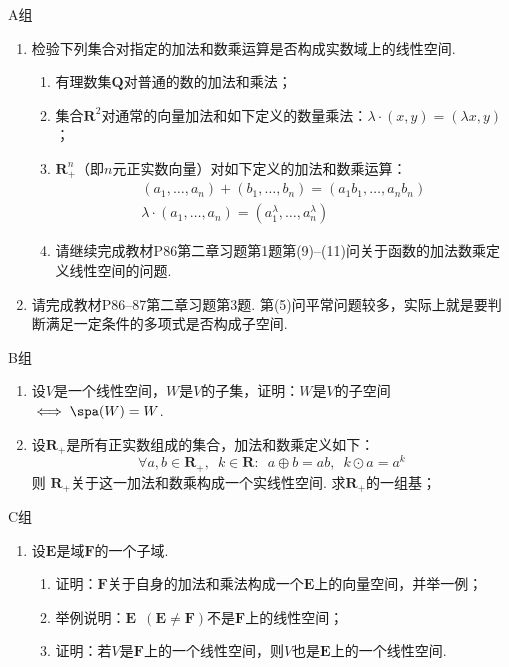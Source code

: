 \centerline{\heiti A组}
\begin{enumerate}
    \item 检验下列集合对指定的加法和数乘运算是否构成实数域上的线性空间.
          \begin{enumerate}
              \item 有理数集$\mathbf{Q}$对普通的数的加法和乘法；

              \item 集合$\mathbf{R}^2$对通常的向量加法和如下定义的数量乘法：$\lambda\cdot(x,y)=(\lambda x,y)$；

              \item $\mathbf{R}_+^n$（即$n$元正实数向量）对如下定义的加法和数乘运算：
                    \begin{gather*}
                        (a_1,\ldots,a_n)+(b_1,\ldots,b_n)=(a_1b_1,\ldots,a_nb_n) \\
                        \lambda\cdot(a_1,\ldots,a_n)=(a_1^\lambda,\ldots,a_n^\lambda)
                    \end{gather*}

              \item 请继续完成教材P86第二章习题第1题第(9)--(11)问关于函数的加法数乘定义线性空间的问题.
          \end{enumerate}

    \item 请完成教材P86--87第二章习题第3题. 第(5)问平常问题较多，实际上就是要判断满足一定条件的多项式是否构成子空间.
\end{enumerate}

\centerline{\heiti B组}
\begin{enumerate}
    \item 设$V$是一个线性空间，$W$是$V$的子集，证明：$W$是$V$的子空间$\iff \spa(W)=W$.

    \item 设$\mathbf{R}_+$是所有正实数组成的集合，加法和数乘定义如下：
          \[ \forall a,b \in \mathbf{R}_+,\enspace k\in \mathbf{R}\colon\enspace a\oplus b = ab,\enspace k\odot a = a^k \]
          则 $\mathbf{R}_+$关于这一加法和数乘构成一个实线性空间. 求$\mathbf{R}_+$的一组基；
\end{enumerate}

\centerline{\heiti C组}
\begin{enumerate}
    \item 设$\mathbf{E}$是域$\mathbf{F}$的一个子域.
          \begin{enumerate}
              \item 证明：$\mathbf{F}$关于自身的加法和乘法构成一个$\mathbf{E}$上的向量空间，并举一例；

              \item 举例说明：$\mathbf{E}\enspace(\mathbf{E}\neq \mathbf{F})$不是$\mathbf{F}$上的线性空间；

              \item 证明：若$V$是$\mathbf{F}$上的一个线性空间，则$V$也是$\mathbf{E}$上的一个线性空间.
          \end{enumerate}
\end{enumerate}
